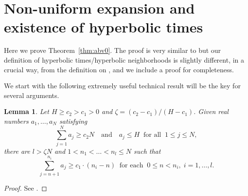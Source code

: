 \documentclass[reqno,12pt,a4paper]{amsart}
\theoremstyle{plain}
\newtheorem{lemma}[theorem]{Lemma}
\theoremstyle{definition}
\begin{document}
\appendix

\section{Non-uniform expansion and existence of hyperbolic
times}
\label{sec:hyperb-neighb-constr}

Here we prove Theorem~\ref{thm:abv0}. The proof is very
similar to \cite[Lemma 5.4]{ABV00} but our definition of
hyperbolic times/hyperbolic neighborhoods
is slightly different, in a crucial way, from the definition
on \cite{ABV00}, and we include a proof for completeness.

We start with the following extremely useful technical
result will be the key for several arguments.

\begin{lemma}
  \label{le:Pliss}
  Let $H\ge c_2 > c_1 >0$ and
  $\zeta={(c_2-c_1)}/{(H-c_1)}$. Given real numbers
  $a_1,\ldots,a_N$ satisfying
 $$
 \sum_{j=1}^N a_j \ge c_2 N \quad\text{and}\quad a_j\le H
 \;\;\mbox{for all}\;\; 1\le j\le N,
 $$
 there are $l>\zeta N$ and $1<n_1<\ldots<n_l\le N$ such
 that $$ \sum_{j=n+1}^{n_i} a_j \ge c_1\cdot(n_i-n)
 \;\;\mbox{for each}\;\; 0\le n < n_i, \; i=1,\ldots,l. $$
\end{lemma}

\begin{proof}
  See \cite[Lemma 11.3]{Man87}.
\end{proof}
\end{document}
